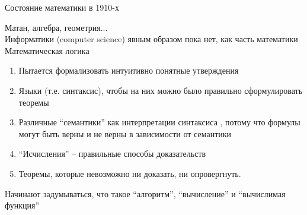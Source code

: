 
\begin{frame}{Состояние математики в 1910-х}

 	Матан, алгебра, геометрия...\\
 	Информатики (computer science) явным образом пока нет, как часть математики\\

 	Математическая логика
 	\begin{enumerate}
 		\item Пытается формализовать интуитивно понятные утверждения
 		\item Языки (т.е. синтаксис), чтобы на них можно было правильно сформулировать теоремы
 		\item Различные ``семантики'' как интерпретации синтаксиса , потому что формулы могут быть верны и не верны в зависимости от семантики
 		\item ``Исчисления'' -- правильные способы доказательств
 		\item Теоремы, которые невозможно ни доказать, ни опровергнуть.
 	\end{enumerate}
 	Начинают задумываться, что такое ``алгоритм'', ``вычисление'' и ``вычислимая функция''

 \end{frame}

